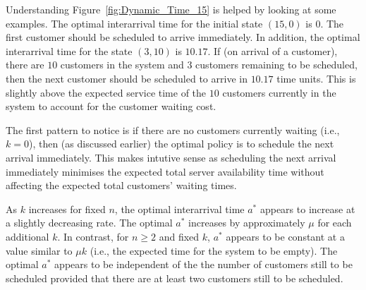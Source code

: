 Understanding Figure~\ref{fig:Dynamic_Time_15} is helped by looking at some examples. The optimal interarrival time for the initial state $(15, 0)$ is $0$. The first customer should be scheduled to arrive immediately. In addition, the optimal interarrival time for the state $(3, 10)$ is $10.17$. If (on arrival of a customer), there are $10$ customers in the system and $3$ customers remaining to be scheduled, then the next customer should be scheduled to arrive in $10.17$ time units. This is slightly above the expected service time of the $10$ customers currently in the system to account for the customer waiting cost.

The first pattern to notice is if there are no customers currently waiting (i.e., $k = 0$), then (as discussed earlier) the optimal policy is to schedule the next arrival immediately. This makes intutive sense as scheduling the next arrival immediately minimises the expected total server availability time without affecting the expected total customers' waiting times.

As $k$ increases for fixed $n$, the optimal interarrival time $a^{*}$ appears to increase at a slightly decreasing rate. The optimal $a^{*}$ increases by approximately $\mu$ for each additional $k$. In contrast, for $n \geq 2$ and fixed $k$, $a^{*}$ appears to be constant at a value similar to $\mu k$ (i.e., the expected time for the system to be empty). The optimal $a^{*}$ appears to be independent of the the number of customers still to be scheduled provided that there are at least two customers still to be scheduled.

































